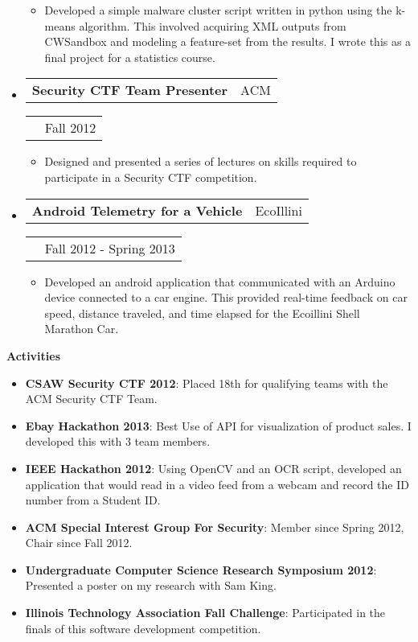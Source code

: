 \documentclass[letterpaper,11pt]{article}
\makeatletter
\newcommand{\resitem}[1]{\item #1 \vspace{-5pt}}
\newcommand{\resheading}[1]{{\large \colorbox{mygrey}{\begin{minipage}{\textwidth}{\textbf{#1 \vphantom{p\^{E}}}}\end{minipage}}}}
\newcommand{\resexperience}[4]
{
  \begin{tabular*}{6.5in}{l@{\extracolsep{\fill}}r}
    \textbf{#1} & \footnotesize{#2}
  \end{tabular*}
  \begin{tabular*}{6.5in}{l@{\extracolsep{\fill}}r}
    \textit{#3} & \footnotesize{#4}
  \end{tabular*}
  \vspace{-8pt}
}
\newcommand{\resskill}[2]
{
  \footnotesize{\textbf{#1}}: \footnotesize{#2}\\
}
\makeatother
\begin{document}
\begin{itemize}
{    \begin{itemize}
      \resitem{ Developed a simple malware cluster script written in python using the
  k-means algorithm.  This involved acquiring XML outputs from
  CWSandbox and modeling a feature-set from the results.  I wrote this
  as a final project for a statistics course.}
    \end{itemize}
  }
\item
  \resexperience{Security CTF Team Presenter}{ACM}{}{Fall 2012}
  {\footnotesize
    \begin{itemize}
      \resitem{ Designed and presented a series of lectures on skills required to
  participate in a Security CTF competition.}
    \end{itemize}
  }
\item
  \resexperience{Android Telemetry for a Vehicle}{EcoIllini}{}{Fall 2012 -
    Spring 2013}
  {\footnotesize
    \begin{itemize}
      \resitem{Developed an android application that communicated with an
  Arduino device connected to a car engine.  This provided real-time
  feedback on car speed, distance traveled, and time elapsed for the
  Ecoillini Shell Marathon Car.}
    \end{itemize}
  }
\end{itemize}

\resheading{Activities}
\begin{itemize}
\item
  \resskill{CSAW Security CTF 2012}{Placed 18th for qualifying teams
    with the ACM Security CTF Team.}
\item
  \resskill{Ebay Hackathon 2013}{Best Use of API for visualization of
    product sales.  I developed this with 3 team members.}
\item
  \resskill{IEEE Hackathon 2012}{Using OpenCV and an OCR script,
    developed an application that would read in a video feed from a
    webcam and record the ID number from a Student ID.}
\item
  \resskill{ACM Special Interest Group For Security}{Member since
    Spring 2012, Chair since Fall 2012.}
\item
  \resskill{Undergraduate Computer Science Research Symposium
    2012}{Presented a poster on my research with Sam King.}
\item
  \resskill{Illinois Technology Association Fall
    Challenge}{Participated in the finals of this software development
    competition.}
\end{itemize}
\end{document}
